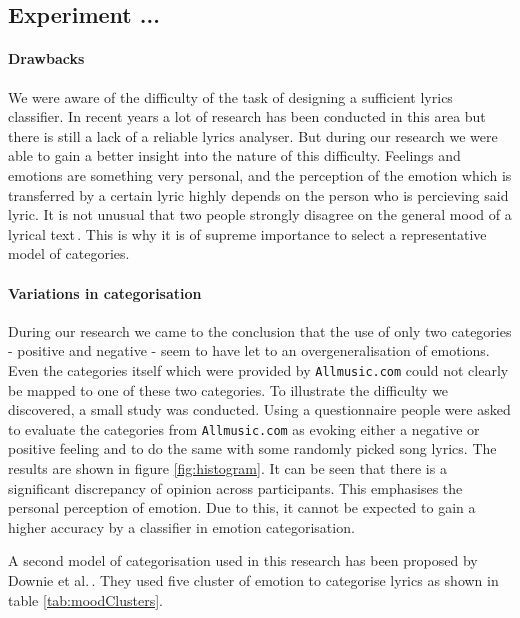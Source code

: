 \documentclass[a4paper,12pt]{article}
\begin{document}
\subsection{Experiment ...}

\paragraph{Drawbacks} We were aware of the difficulty of the task of designing a sufficient lyrics classifier. In recent years a lot of research has been conducted in this area but there is still a lack of a reliable lyrics analyser. But during our research we were able to gain a better insight into the nature of this difficulty. Feelings and emotions are something very personal, and the perception of the emotion which is transferred by a certain lyric highly depends on the person who is percieving said lyric. It is not unusual that two people strongly disagree on the general mood of a lyrical text\,\cite{wilson2005recognizing}. This is why it is of supreme importance to select a representative model of categories.

\paragraph{Variations in categorisation} During our research we came to the conclusion that the use of only two categories - positive and negative - seem to have let to an overgeneralisation of emotions. Even the categories itself which were provided by \texttt{Allmusic.com} could not clearly be mapped to one of these two categories. To illustrate the difficulty we discovered, a small study was conducted. Using a questionnaire people were asked to evaluate the categories from \texttt{Allmusic.com} as evoking either a negative or positive feeling and to do the same with some randomly picked song lyrics. The results are shown in figure \ref{fig:histogram}. It can be seen that there is a significant discrepancy of opinion across participants. This emphasises the personal perception of emotion. Due to this, it cannot be expected to gain a higher accuracy by a classifier in emotion categorisation.

A second model of categorisation used in this research has been proposed by Downie et al.\,\cite{downie20082007}. They used five cluster of emotion to categorise lyrics as shown in table \ref{tab:moodClusters}.
\end{document}
